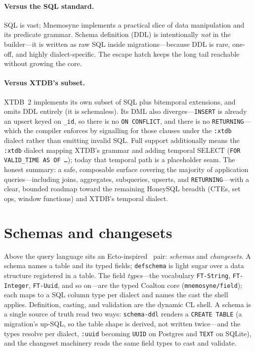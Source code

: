 \documentclass[11pt,a4paper]{article}
\begin{document}
\paragraph{Versus the SQL standard.} SQL is vast; Mnemosyne implements a practical slice of
data manipulation and its predicate grammar. Schema definition (DDL) is intentionally
\emph{not} in the builder---it is written as raw SQL inside migrations---because DDL is rare,
one-off, and highly dialect-specific. The escape hatch keeps the long tail reachable without
growing the core.

\paragraph{Versus XTDB's subset.} XTDB~2 implements its own subset of SQL plus bitemporal
extensions, and omits DDL entirely (it is schemaless). Its DML also diverges---\texttt{INSERT}
is already an upsert keyed on \texttt{\_id}, so there is no \texttt{ON CONFLICT}, and there is
no \texttt{RETURNING}---which the compiler enforces by signalling for those clauses under the
\texttt{:xtdb} dialect rather than emitting invalid SQL. Full support additionally means the
\texttt{:xtdb} dialect mapping XTDB's grammar and adding temporal SELECT (\texttt{FOR
VALID\_TIME AS OF \ldots}); today that temporal path is a placeholder seam. The honest
summary: a safe, composable surface covering the majority of application queries---including
joins, aggregates, subqueries, upserts, and \texttt{RETURNING}---with a clear, bounded
roadmap toward the remaining HoneySQL breadth (CTEs, set ops, window functions) and XTDB's
temporal dialect.

\section{Schemas and changesets}
\label{sec:schema}
Above the query language sits an Ecto-inspired~\citep{ecto} pair: \emph{schemas} and
\emph{changesets}. A schema names a table and its typed fields; \texttt{defschema} is light
sugar over a data structure registered in a table. The field \emph{types}---the vocabulary
\texttt{FT-String}, \texttt{FT-Integer}, \texttt{FT-Uuid}, and so on---are the typed Coalton
core (\texttt{mnemosyne/field}); each maps to a SQL column type per dialect and names the
cast the shell applies. Definition, casting, and validation are the dynamic CL shell. A
schema is a single source of truth read two ways: \texttt{schema-ddl} renders a
\texttt{CREATE TABLE} (a migration's up-SQL, so the table shape is derived, not written
twice---and the types resolve per dialect, \texttt{:uuid} becoming \texttt{UUID} on Postgres
and \texttt{TEXT} on SQLite), and the changeset machinery reads the same field types to cast
and validate.
\end{document}
